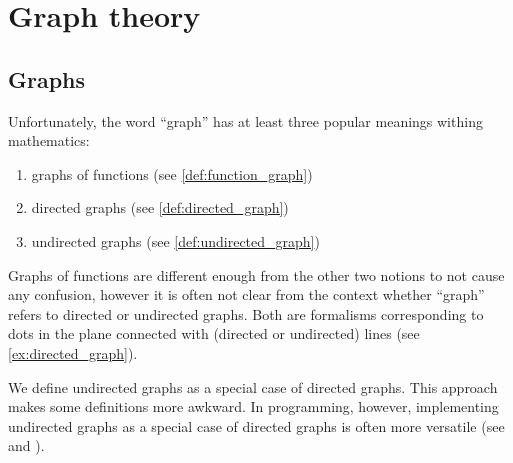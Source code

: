 \section{Graph theory}\label{sec:graph_theory}
\subsection{Graphs}\label{subsec:graphs}

\begin{remark}\label{remark:directed_and_undirected_graphs}
  Unfortunately, the word \enquote{graph} has at least three popular meanings withing mathematics:
  \begin{enumerate}
    \item graphs of functions (see \cref{def:function_graph})
    \item directed graphs (see \cref{def:directed_graph})
    \item undirected graphs (see \cref{def:undirected_graph})
  \end{enumerate}

  Graphs of functions are different enough from the other two notions to not cause any confusion, however it is often not clear from the context whether \enquote{graph} refers to directed or undirected graphs. Both are formalisms corresponding to dots in the plane connected with (directed or undirected) lines (see \cref{ex:directed_graph}).

  We define undirected graphs as a special case of directed graphs. This approach makes some definitions more awkward. In programming, however, implementing undirected graphs as a special case of directed graphs is often more versatile (see \cite[section 5.4]{Erickson2019} and \cite[chapter 1, section 2.4]{Gondran1984}).
\end{remark}

